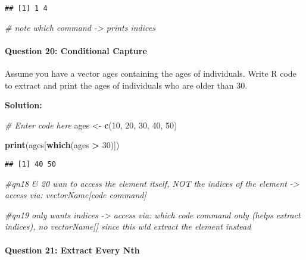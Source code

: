 \documentclass[
]{article}
\newenvironment{Shaded}{\begin{snugshade}}{\end{snugshade}}
\newcommand{\CommentTok}[1]{\textcolor[rgb]{0.56,0.35,0.01}{\textit{#1}}}
\newcommand{\DecValTok}[1]{\textcolor[rgb]{0.00,0.00,0.81}{#1}}
\newcommand{\FunctionTok}[1]{\textcolor[rgb]{0.13,0.29,0.53}{\textbf{#1}}}
\newcommand{\NormalTok}[1]{#1}
\newcommand{\OtherTok}[1]{\textcolor[rgb]{0.56,0.35,0.01}{#1}}
\newcommand{\SpecialCharTok}[1]{\textcolor[rgb]{0.81,0.36,0.00}{\textbf{#1}}}
\begin{document}
\begin{verbatim}
## [1] 1 4
\end{verbatim}

\begin{Shaded}
\begin{Highlighting}[]
\CommentTok{\# note which command {-}\textgreater{} prints indices}
\end{Highlighting}
\end{Shaded}

\hypertarget{question-20-conditional-capture}{%
\paragraph{Question 20: Conditional
Capture}\label{question-20-conditional-capture}}

Assume you have a vector ages containing the ages of individuals. Write
R code to extract and print the ages of individuals who are older than
30.

\textbf{Solution:}

\begin{Shaded}
\begin{Highlighting}[]
\CommentTok{\# Enter code here}
\NormalTok{ages }\OtherTok{\textless{}{-}} \FunctionTok{c}\NormalTok{(}\DecValTok{10}\NormalTok{, }\DecValTok{20}\NormalTok{, }\DecValTok{30}\NormalTok{, }\DecValTok{40}\NormalTok{, }\DecValTok{50}\NormalTok{)}

\FunctionTok{print}\NormalTok{(ages[}\FunctionTok{which}\NormalTok{(ages }\SpecialCharTok{\textgreater{}} \DecValTok{30}\NormalTok{)])}
\end{Highlighting}
\end{Shaded}

\begin{verbatim}
## [1] 40 50
\end{verbatim}

\begin{Shaded}
\begin{Highlighting}[]
\CommentTok{\#qn18 \& 20 wan to access the element itself, NOT the indices of the element {-}\textgreater{} access via: vectorName[code command]}

\CommentTok{\#qn19 only wants indices {-}\textgreater{} access via: which code command only (helps extract indices), no vectorName[] since this wld extract the element instead}
\end{Highlighting}
\end{Shaded}

\hypertarget{question-21-extract-every-nth}{%
\paragraph{Question 21: Extract Every
Nth}\label{question-21-extract-every-nth}}
\end{document}
